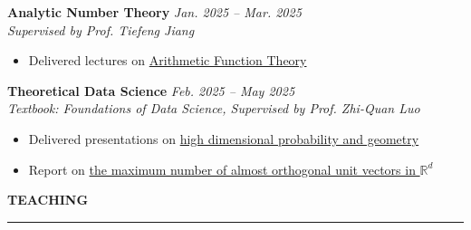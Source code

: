 \documentclass[10pt]{extarticle}
\newlength{\titlelength}
\newcommand{\customsection}[1]{
  \vspace{0.4em}%
  \settowidth{\titlelength}{\color{sectioncolor}\Large\bfseries\uppercase{#1}}
  {\color{sectioncolor}\Large\bfseries\uppercase{#1}} 
  {\color{sectioncolor}\rule[0.5ex]{\linewidth-\titlelength-0em}{0.5pt}}\par\vspace{0.2em}%
}
\begin{document}
\textbf{Analytic Number Theory} \hfill \textit{Jan. 2025 -- Mar. 2025}\\
\textit{Supervised by Prof. Tiefeng Jiang}
\begin{itemize}[leftmargin=1em, label=$\bullet$, nosep, topsep=0pt]
  \item Delivered lectures on \href{https://bingran-li.github.io/blog/notes/Resource.html}{Arithmetic Function Theory}
\end{itemize}

\textbf{Theoretical Data Science} \hfill \textit{Feb. 2025 -- May 2025}\\
\textit{Textbook: Foundations of Data Science,  Supervised by Prof. Zhi-Quan Luo}
\begin{itemize}[leftmargin=1em, label=$\bullet$, nosep, topsep=0pt]
  \item Delivered presentations on \href{https://bingran-li.github.io/blog/High\%20Dimensional\%20Probability.html\#high-dimensional-probability}{high dimensional probability and geometry}
  \item Report on \href{https://bingran-li.github.io/blog/notes/Probability\%20in\%20Combinatorics.html\#welch-bound}{the maximum number of almost orthogonal unit vectors in $\mathbb{R}^d$}
\end{itemize}


\customsection{Teaching}
\end{document}
